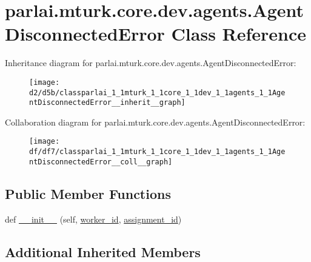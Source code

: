 \hypertarget{classparlai_1_1mturk_1_1core_1_1dev_1_1agents_1_1AgentDisconnectedError}{}\section{parlai.\+mturk.\+core.\+dev.\+agents.\+Agent\+Disconnected\+Error Class Reference}
\label{classparlai_1_1mturk_1_1core_1_1dev_1_1agents_1_1AgentDisconnectedError}


Inheritance diagram for parlai.\+mturk.\+core.\+dev.\+agents.\+Agent\+Disconnected\+Error\+:
\nopagebreak
\begin{figure}[H]
\begin{center}
\leavevmode
\texttt{[image: d2/d5b/classparlai\_1\_1mturk\_1\_1core\_1\_1dev\_1\_1agents\_1\_1AgentDisconnectedError\_\_inherit\_\_graph]}
\end{center}
\end{figure}


Collaboration diagram for parlai.\+mturk.\+core.\+dev.\+agents.\+Agent\+Disconnected\+Error\+:
\nopagebreak
\begin{figure}[H]
\begin{center}
\leavevmode
\texttt{[image: df/df7/classparlai\_1\_1mturk\_1\_1core\_1\_1dev\_1\_1agents\_1\_1AgentDisconnectedError\_\_coll\_\_graph]}
\end{center}
\end{figure}
\subsection*{Public Member Functions}
\begin{DoxyCompactItemize}
\item 
def \hyperlink{classparlai_1_1mturk_1_1core_1_1dev_1_1agents_1_1AgentDisconnectedError_a4a25d21dfcd5e987b5843226cfe586c1}{\+\_\+\+\_\+init\+\_\+\+\_\+} (self, \hyperlink{classparlai_1_1mturk_1_1core_1_1dev_1_1agents_1_1AbsentAgentError_a26db50c87a5d4954907d538de3da875c}{worker\+\_\+id}, \hyperlink{classparlai_1_1mturk_1_1core_1_1dev_1_1agents_1_1AbsentAgentError_ab9cf020196d28024b307c41a3fff6be1}{assignment\+\_\+id})
\end{DoxyCompactItemize}
\subsection*{Additional Inherited Members}



